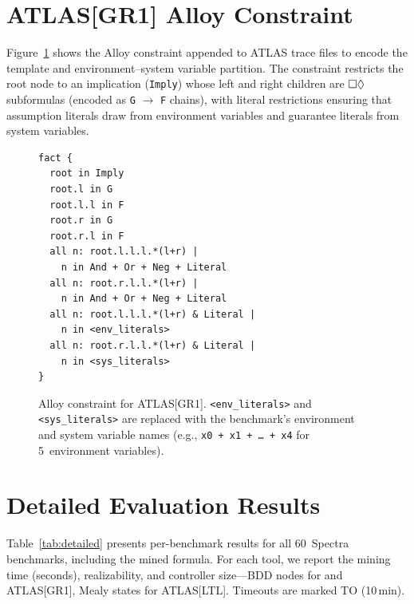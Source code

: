 \section{ATLAS[GR1] Alloy Constraint}\label{app:alloy}

Figure~\ref{fig:alloy} shows the Alloy constraint appended to
ATLAS trace files to encode the \GRone template and
environment--system variable partition.
The constraint restricts the root node to an implication
(\texttt{Imply}) whose left and right children are
$\square\Diamond$ subformulas (encoded as \texttt{G} $\to$
\texttt{F} chains), with literal restrictions ensuring that
assumption literals draw from environment variables and guarantee
literals from system variables.

\begin{figure}[h]
\begin{small}
\begin{verbatim}
fact {
  root in Imply
  root.l in G
  root.l.l in F
  root.r in G
  root.r.l in F
  all n: root.l.l.l.*(l+r) |
    n in And + Or + Neg + Literal
  all n: root.r.l.l.*(l+r) |
    n in And + Or + Neg + Literal
  all n: root.l.l.l.*(l+r) & Literal |
    n in <env_literals>
  all n: root.r.l.l.*(l+r) & Literal |
    n in <sys_literals>
}
\end{verbatim}
\end{small}
\caption{Alloy constraint for ATLAS[GR1].
\texttt{<env\_literals>} and \texttt{<sys\_literals>} are
replaced with the benchmark's environment and system variable
names (e.g., \texttt{x0~+~x1~+~\ldots~+~x4} for 5~environment
variables).}\label{fig:alloy}
\end{figure}

\section{Detailed Evaluation Results}\label{app:detailed}

Table~\ref{tab:detailed} presents per-benchmark results for all
60~Spectra benchmarks, including the mined \toolname formula.
For each tool, we report the mining time (seconds),
realizability, and controller size---BDD nodes for
\toolname and ATLAS[GR1], Mealy states for ATLAS[LTL].
Timeouts are marked TO (10\,min).


